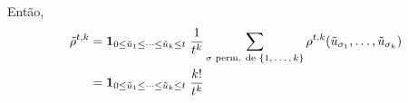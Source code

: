 \begin{topics}
Então,
\begin{equation}
  \begin{split}
    \tilde{\rho}^{t, k} & = {\bf 1}_{0 \leq \tilde{u}_1 \leq \dots \leq \tilde{u}_k \leq t} \; \frac{1}{t^k} \sum_{\sigma \text{ perm. de $\{1, \dots, k\}$}} \rho^{t, k}(\tilde{u}_{\sigma_1}, \dots, \tilde{u}_{\sigma_k}) \\
    & = {\bf 1}_{0 \leq \tilde{u}_1 \leq \dots \leq \tilde{u}_k \leq t} \; \frac{k!}{t^k}
  \end{split}
\end{equation}

\end{topics}



